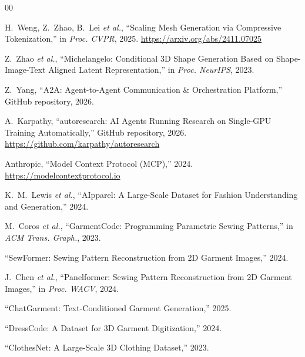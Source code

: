 \documentclass[conference]{IEEEtran}
\begin{document}

\begin{thebibliography}{00}

H.~Weng, Z.~Zhao, B.~Lei \emph{et al.}, ``Scaling Mesh Generation via Compressive Tokenization,'' in \emph{Proc. CVPR}, 2025.
\url{https://arxiv.org/abs/2411.07025}

Z.~Zhao \emph{et al.}, ``Michelangelo: Conditional 3D Shape Generation Based on Shape-Image-Text Aligned Latent Representation,'' in \emph{Proc. NeurIPS}, 2023.

Z.~Yang, ``A2A: Agent-to-Agent Communication \& Orchestration Platform,'' GitHub repository, 2026.

A.~Karpathy, ``autoresearch: AI Agents Running Research on Single-GPU Training Automatically,'' GitHub repository, 2026.
\url{https://github.com/karpathy/autoresearch}

Anthropic, ``Model Context Protocol (MCP),'' 2024.
\url{https://modelcontextprotocol.io}

K.~M.~Lewis \emph{et al.}, ``AIpparel: A Large-Scale Dataset for Fashion Understanding and Generation,'' 2024.

M.~Coros \emph{et al.}, ``GarmentCode: Programming Parametric Sewing Patterns,'' in \emph{ACM Trans. Graph.}, 2023.

``SewFormer: Sewing Pattern Reconstruction from 2D Garment Images,'' 2024.

J.~Chen \emph{et al.}, ``Panelformer: Sewing Pattern Reconstruction from 2D Garment Images,'' in \emph{Proc. WACV}, 2024.

``ChatGarment: Text-Conditioned Garment Generation,'' 2025.

``DressCode: A Dataset for 3D Garment Digitization,'' 2024.

``ClothesNet: A Large-Scale 3D Clothing Dataset,'' 2023.

\end{thebibliography}
\end{document}
